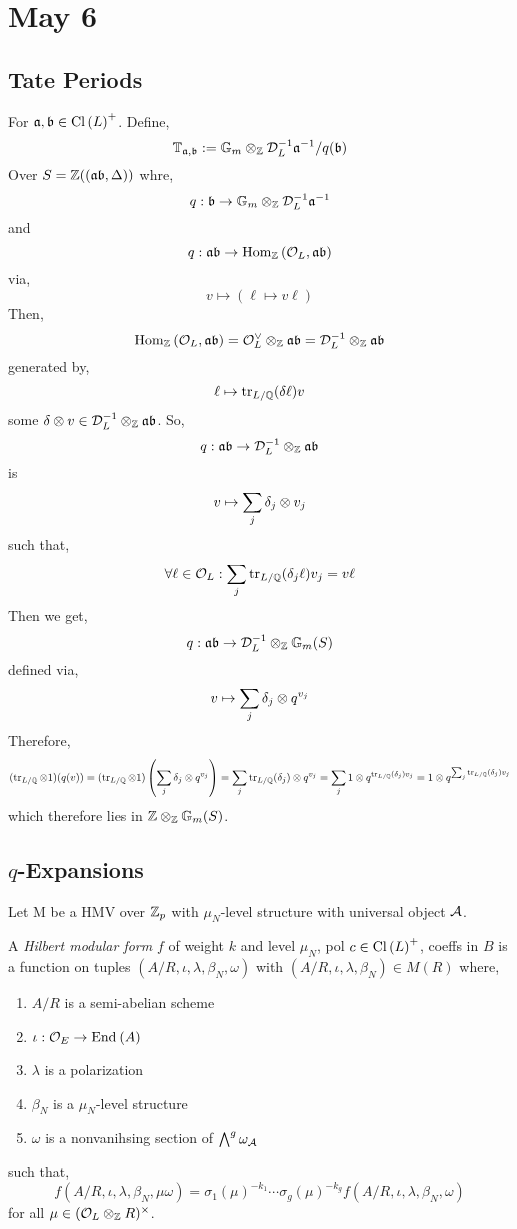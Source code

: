 \documentclass[12pt]{article}
\begin{document}
\section{May 6}

\subsection{Tate Periods}

\newcommand{\TT}{\mathbb{T}}

For $\mathfrak{a},\mathfrak{b} \in \mathrm{Cl} \left( L \right)^+$. 
Define,
\[ \TT_{\a,\b} := \Gm \ot_{\Z} \D_L^{-1} \a^{-1} / q(\b) \]
Over $S = \mathbb{Z}((\mathfrak{a} \mathfrak{b}, \Delta))$ whre,
\[ q : \mathfrak{b} \to \mathbb{G}_m \otimes_{\mathbb{Z}} \mathcal{D}_L^{-1} \mathfrak{a}^{-1} \]
and
\[ q : \mathfrak{a} \mathfrak{b} \to \mathrm{Hom}_{\mathbb{Z}} \left( \mathcal{O}_{L}, \mathfrak{a} \mathfrak{b} \right) \]
via,
\[ v \mapsto (\ell \mapsto v \ell) \]
Then,
\[ \mathrm{Hom}_{\mathbb{Z}} \left( \mathcal{O}_{L}, \mathfrak{a} \mathfrak{b} \right) = \mathcal{O}_{L}^\vee \otimes_{\mathbb{Z}} \mathfrak{a} \mathfrak{b} = \mathcal{D}_L^{-1} \otimes_{\mathbb{Z}} \mathfrak{a} \mathfrak{b} \]
generated by,
\[ \ell \mapsto \operatorname{\mathrm{tr}}_{L/\mathbb{Q}} (\delta \ell) v \]
some $\delta \otimes v \in \mathcal{D}_L^{-1} \otimes_{\mathbb{Z}} \mathfrak{a} \mathfrak{b}$. So,
\[ q : \mathfrak{a} \mathfrak{b} \to \mathcal{D}_L^{-1} \otimes_{\mathbb{Z}} \mathfrak{a} \mathfrak{b} \]
is 
\[ v \mapsto \sum_j \delta_j \otimes v_j \]
such that,
\[ \forall \ell \in \mathcal{O}_{L} : \sum_j \operatorname{\mathrm{tr}}_{L/\mathbb{Q}}(\delta_j \ell) v_j = v \ell \]
Then we get,
\[ q : \mathfrak{a} \mathfrak{b} \to \mathcal{D}_L^{-1} \otimes_{\mathbb{Z}} \mathbb{G}_m(S) \]
defined via,
\[ v \mapsto \sum_j \delta_j \otimes q^{v_j} \]
Therefore,
\[ (\operatorname{\mathrm{tr}}_{L/\mathbb{Q}} \otimes 1)(q(v)) = (\operatorname{\mathrm{tr}}_{L/\mathbb{Q}} \otimes 1) \left( \sum_j \delta_j \otimes q^{v_j} \right) = \sum_j \operatorname{\mathrm{tr}}_{L/\mathbb{Q}}(\delta_j) \otimes q^{v_j} = \sum_j 1 \otimes q^{\operatorname{\mathrm{tr}}_{L/\mathbb{Q}}(\delta_j) v_j} = 1 \otimes q^{\sum_j \operatorname{\mathrm{tr}}_{L / \mathbb{Q}}(\delta_j) v_j} \] 
which therefore lies in $\mathbb{Z} \otimes_{\mathbb{Z}} \mathbb{G}_m(S)$.

\subsection{$q$-Expansions}

Let M be a HMV over $\mathbb{Z}_p$ with $\mu_N$-level structure with universal object $\mathcal{A}$.

\begin{defn}
A \textit{Hilbert modular form} $f$ of weight $k$ and level $\mu_N$, pol $c \in \mathrm{Cl} \left( L \right)^+$, coeffs in $B$ is a function on tuples $(A/R, \iota, \lambda, \beta_N, \omega)$ with $(A/R, \iota, \lambda, \beta_N) \in M(R)$ where,
\begin{enumerate}
\item $A / R$ is a semi-abelian scheme
\item $\iota : \mathcal{O}_{E} \to \mathrm{End}_{} \left( A \right)$
\item $\lambda$ is a polarization
\item $\beta_N$ is a $\mu_N$-level structure
\item $\omega$ is a nonvanihsing section of $\bigwedge^g \omega_{\mathcal{A}}$
\end{enumerate}
such that,
\[ f(A/R, \iota, \lambda, \beta_N, \mu \omega) = \sigma_1(\mu)^{-k_1} \cdots \sigma_g(\mu)^{-k_g} f(A/R, \iota, \lambda, \beta_N, \omega) \]
for all $\mu \in (\mathcal{O}_{L} \otimes_{\mathbb{Z}} R)^\times$.
\end{defn}
\end{document}
